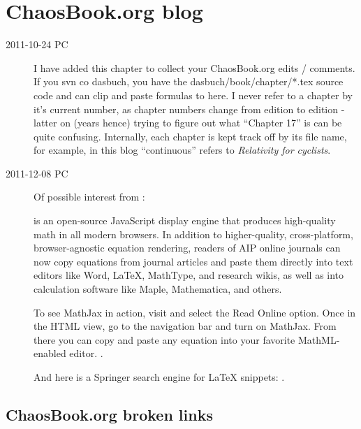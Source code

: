 
\chapter{ChaosBook.org blog}
\label{chap:ChaosBook}

\begin{description}

\item[2011-10-24 PC]
I have added this chapter to collect your ChaosBook.org edits /
comments. If you svn co dasbuch, you have the dasbuch/book/chapter/*.tex
source code and can clip and paste formulas to here. I never refer to a
chapter by it's current number, as chapter numbers change from edition to
edition - latter on (years hence) trying to figure out what ``Chapter
17'' is can be quite confusing. Internally, each chapter is kept track
off by its file name, for example, in this blog ``continuous'' refers to
 {\em Relativity for cyclists}.

\item[2011-12-08 PC] Of possible interest from
:

 is an open-source JavaScript
display engine that produces high-quality math in all modern browsers. In
addition to higher-quality, cross-platform, browser-agnostic equation
rendering, readers of AIP online journals can now copy equations from
journal articles and paste them directly into text editors like Word,
LaTeX, MathType, and research wikis, as well as into calculation software
like Maple, Mathematica, and others.

To see MathJax in action, visit
 and select the Read Online option. Once in the
HTML view, go to the navigation bar and turn on MathJax. From there you
can copy and paste any equation into your favorite MathML-enabled editor.
.

And here is a Springer search engine for LaTeX snippets:
.

\end{description}

\section{ChaosBook.org broken links}
\label{c-brokenLinks}

